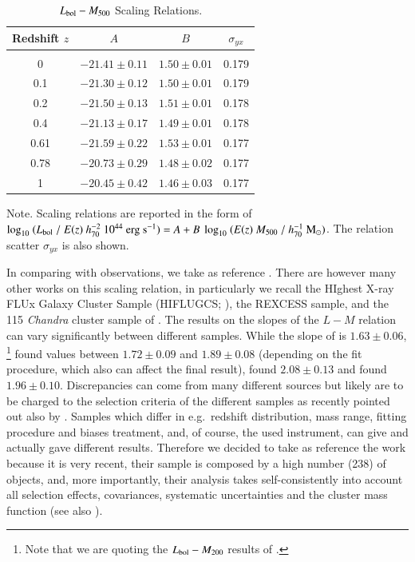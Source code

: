\documentclass[traditabstract]{aa}
\newcommand{\rmn}{\mathrm}
\begin{document}
\begin{table}[hbt!]
\begin{center}
\caption{$L_{\rm{bol}}-M_{500}$ Scaling Relations.}
\medskip
\begin{tabular}{cccc}
\hline
\phantom{\Big|}
Redshift $z$ & $A$ & $B$ & $\sigma_{yx}$ \\
\hline \\[-0.5em]
 0      & $-21.41\pm0.11$ & $1.50\pm0.01$ & 0.179\\
 0.1   & $-21.30\pm0.12$ & $1.50\pm0.01$ & 0.179\\
 0.2   & $-21.50\pm0.13$ & $1.51\pm0.01$ & 0.178\\ 
 0.4   & $-21.13\pm0.17$ & $1.49\pm0.01$ & 0.178\\ 
 0.61 & $-21.59\pm0.22$ & $1.53\pm0.01$ & 0.177\\ 
 0.78 & $-20.73\pm0.29$ & $1.48\pm0.02$ & 0.177\\ 
 1      & $-20.45\pm0.42$ & $1.46\pm0.03$ & 0.177\\[0.5em]
\hline
\end{tabular}
\label{tab:LMfits}
\end{center}
\footnotesize{Note. Scaling relations are reported in the form of $\log_{10}~(L_{\rm{bol}}~/~E(z)~h_{70}^{-2}~10^{44}~\rmn{erg~s}^{-1})=A+B~\log_{10}~(E(z)~M_{500}~/~h_{70}^{-1}~\rmn{M_{\odot}})$. The relation scatter $\sigma_{yx}$ is also shown.
}
\end{table}

In comparing with observations, we take as reference \cite{2010MNRAS.406.1773M}. There are however many other works on this scaling relation, in particularly we recall the HIghest X-ray FLUx Galaxy Cluster Sample (HIFLUGCS; \citealp{2002ApJ...567..716R}), the REXCESS \citep{2009A&A...498..361P} sample, and the 115 \emph{Chandra} cluster sample of \cite{2007ApJ...668..772M}. The results on the slopes of the $L-M$ relation can vary significantly between different samples. While the slope of \cite{2010MNRAS.406.1773M} is $1.63\pm0.06$, \cite{2002ApJ...567..716R}\footnote[8]{Note that we are quoting the $L_{\rm{bol}}-M_{200}$ results of \cite{2002ApJ...567..716R}.} found values between $1.72\pm0.09$ and $1.89\pm0.08$ (depending on the fit procedure, which also can affect the final result), \cite{2009A&A...498..361P} found $2.08\pm0.13$ and \cite{2007ApJ...668..772M} found $1.96\pm0.10$. Discrepancies can come from many different sources but likely are to be charged to the selection criteria of the different samples as recently pointed out also by \cite{2011arXiv1109.3708R}. Samples which differ in e.g.~redshift distribution, mass range, fitting procedure and biases treatment, and, of course, the used instrument, can give and actually gave different results. Therefore we decided to take as reference the \cite{2010MNRAS.406.1773M} work because it is very recent, their sample is composed by a high number (238) of objects, and, more importantly, their analysis takes self-consistently into account all selection effects, covariances, systematic uncertainties and the cluster mass function (see also \citealp{2010MNRAS.406.1759M}).
\end{document}
